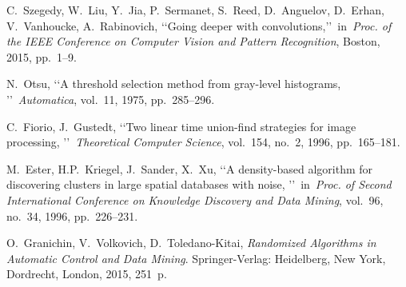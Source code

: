 \documentclass[conference,a4paper,twocolumn]{IEEEtran}
\begin{document}
\begin{thebibliography}{99}
 C.~Szegedy, W.~Liu, Y.~Jia, P.~Sermanet, S.~Reed, D.~Anguelov, D.~Erhan, V.~Vanhoucke, A.~Rabinovich, \lq\lq Going deeper with convolutions,\rq\rq~in~\emph{Proc. of the IEEE Conference on Computer Vision and Pattern Recognition}, Boston, 2015, pp.~1--9.

 N.~Otsu, \lq\lq A threshold selection method from gray-level histograms, \rq\rq~\emph{Automatica}, vol.~11, 1975, pp.~285--296.

 C.~Fiorio, J.~Gustedt, \lq\lq Two linear time union-find strategies for image processing, \rq\rq~\emph{Theoretical Computer Science}, vol.~154, no.~2, 1996, pp.~165--181.

 M.~Ester, H.P.~Kriegel, J.~Sander, X.~Xu, \lq\lq A density-based algorithm for discovering clusters in large spatial databases with noise, \rq\rq~in~\emph{Proc. of Second International
Conference on Knowledge Discovery and Data Mining}, vol.~96, no.~34, 1996, pp.~226--231.

 O.~Granichin, V.~Volkovich, D.~Toledano-Kitai, \emph{Randomized Algorithms in Automatic Control and Data Mining}. Springer-Verlag: Heidelberg, New York, Dordrecht, London, 2015, 251~p.

\end{thebibliography}


\end{document}
